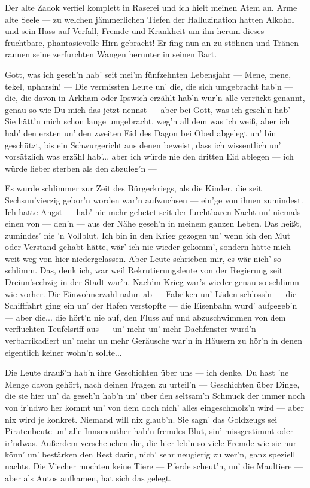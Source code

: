 Der alte Zadok verfiel komplett in Raserei und ich hielt meinen Atem an. Arme alte Seele --- zu welchen jämmerlichen Tiefen der Halluzination hatten Alkohol und sein Hass auf Verfall, Fremde und Krankheit um ihn herum dieses fruchtbare, phantasievolle Hirn gebracht! Er fing nun an zu stöhnen und Tränen rannen seine zerfurchten Wangen herunter in seinen Bart.

\glqq Gott, was ich geseh'n hab' seit mei'm fünfzehnten Lebensjahr --- Mene, mene, tekel, upharsin! --- Die vermissten Leute un' die, die sich umgebracht hab'n --- die, die davon in Arkham oder Ipswich erzählt hab'n wur'n alle verrückt genannt, genau so wie Du mich das jetzt nennst --- aber bei Gott, was ich geseh'n hab' --- Sie hätt'n mich schon lange umgebracht, weg'n all dem was ich weiß, aber ich hab' den ersten un' den zweiten Eid des Dagon bei Obed abgelegt un' bin geschützt, bis ein Schwurgericht aus denen beweist, dass ich wissentlich un' vorsätzlich was erzähl hab'... aber ich würde nie den dritten Eid ablegen --- ich würde lieber sterben als den abzuleg'n ---

Es wurde schlimmer zur Zeit des Bürgerkriegs, als die Kinder, die seit Sechsun'vierzig gebor'n worden war'n aufwuchsen --- ein'ge von ihnen zumindest. Ich hatte Angst --- hab' nie mehr gebetet seit der furchtbaren Nacht un' niemals einen von --- den'n --- aus der Nähe geseh'n in meinem ganzen Leben. Das heißt, zumindes' nie 'n Vollblut. Ich bin in den Krieg gezogen un' wenn ich den Mut oder Verstand gehabt hätte, wär' ich nie wieder gekomm', sondern hätte mich weit weg von hier niedergelassen. Aber Leute schrieben mir, es wär nich' so schlimm. Das, denk ich, war weil Rekrutierungsleute von der Regierung seit Dreiun'sechzig in der Stadt war'n. Nach'm Krieg war's wieder genau so schlimm wie vorher. Die Einwohnerzahl nahm ab --- Fabriken un' Läden schloss'n --- die Schifffahrt ging ein un' der Hafen verstopfte --- die Eisenbahn wurd' aufgegeb'n --- aber die... die hört'n nie auf, den Fluss auf und abzuschwimmen von dem verfluchten Teufelsriff aus --- un' mehr un' mehr Dachfenster wurd'n verbarrikadiert un' mehr un mehr Geräusche war'n in Häusern zu hör'n in denen eigentlich keiner wohn'n sollte...

Die Leute drauß'n hab'n ihre Geschichten über uns --- ich denke, Du hast 'ne Menge davon gehört, nach deinen Fragen zu urteil'n --- Geschichten über Dinge, die sie hier un' da geseh'n hab'n un' über den seltsam'n Schmuck der immer noch von ir'ndwo her kommt un' von dem doch nich' alles eingeschmolz'n wird --- aber nix wird je konkret. Niemand will nix glaub'n. Sie sagn' das Goldzeugs sei Piratenbeute un' alle Innsmouther hab'n fremdes Blut, sin' missgestimmt oder ir'ndwas. Außerdem verscheuchen die, die hier leb'n so viele Fremde wie sie nur könn' un' bestärken den Rest darin, nich' sehr neugierig zu wer'n, ganz speziell nachts. Die Viecher mochten keine Tiere --- Pferde scheut'n, un' die Maultiere --- aber als Autos aufkamen, hat sich das gelegt.

